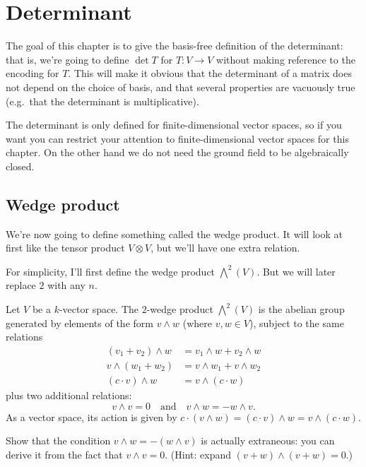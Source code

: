\chapter{Determinant}
\label{ch:determinant}
The goal of this chapter is to give the basis-free
definition of the determinant:
that is, we're going to define $\det T$
for $T \colon V \to V$ without making reference to the encoding for $T$.
This will make it obvious that the determinant of a matrix
does not depend on the choice of basis,
and that several properties are vacuously true
(e.g.\ that the determinant is multiplicative).

The determinant is only defined for finite-dimensional
vector spaces, so if you want you can restrict
your attention to finite-dimensional vector spaces for this chapter.
On the other hand we do not need the
ground field to be algebraically closed.

\section{Wedge product}
We're now going to define something called the wedge product.
It will look at first like the tensor product $V \otimes V$,
but we'll have one extra relation.

For simplicity, I'll first define the wedge product $\bigwedge^2(V)$.
But we will later replace $2$ with any $n$.

\begin{definition}
	Let $V$ be a $k$-vector space.
	The $2$-wedge product $\bigwedge^2(V)$ is the abelian group
	generated by elements of the form $v \wedge w$ (where $v,w \in V$),
	subject to the same relations
	\begin{align*}
		(v_1 + v_2) \wedge w &= v_1 \wedge w + v_2 \wedge w \\
		v \wedge (w_1 + w_2) &= v \wedge w_1 + v \wedge w_2 \\
		(c \cdot v) \wedge w &= v \wedge (c \cdot w)
	\end{align*}
	plus two additional relations:
	\[ v \wedge v = 0 \quad\text{and}\quad
		v \wedge w = - w \wedge v. \]
	As a vector space, its action is given by
	$c \cdot (v \wedge w) = (c \cdot v) \wedge w = v \wedge (c \cdot w)$.
\end{definition}
\begin{exercise}
	Show that the condition $v \wedge w = - (w \wedge v)$
	is actually extraneous:
	you can derive it from the fact that $v \wedge v = 0$.
	(Hint: expand $(v + w) \wedge (v + w) = 0$.)
\end{exercise}

